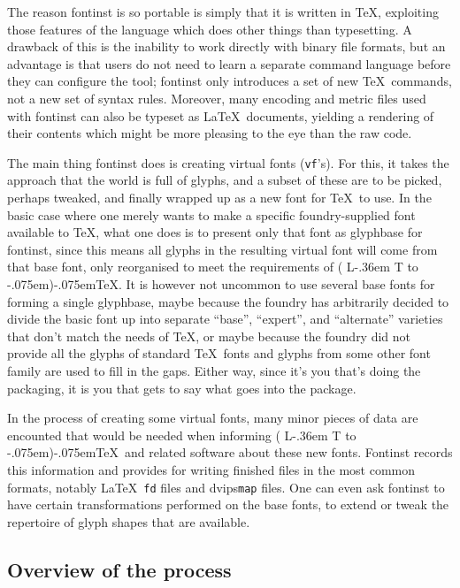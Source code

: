 \documentclass[a4paper]{ltxguide}
\makeatletter
\newcommand{\La}{%
   L\kern-.36em
   {%
      \setbox0\hbox{T}%
      \vbox to\ht0{\hbox{%
         $\m@th$\csname S@\f@size\endcsname
         \fontsize\sf@size\z@\math@fontsfalse\selectfont
         A%
      }\vss}%
   }%
}
\DeclareRobustCommand\AllTeX{(\La\kern-.075em)\kern-.075em\TeX}
\newcommand*{\setfilename}[1]{\texttt{#1}}
\newcommand*{\setpackagename}[1]{\textsf{#1}}
\newcommand{\dvips}   {\setpackagename{dvips}\xspace}
\newcommand{\fontinst}{\setpackagename{font\-inst}\xspace}
\newcommand{\Fontinst}{\setpackagename{Font\-inst}\xspace}
\newcommand{\vf} {\setfilename{vf}\xspace}
\newcommand{\fd} {\setfilename{fd}\xspace}
\newcommand{\map}{\setfilename{map}\xspace}
\makeatother
\begin{document}
The reason \fontinst is so portable is simply that it is written in 
\TeX, exploiting those features of the language which does other 
things than typesetting. A drawback of this is the inability to work 
directly with binary file formats, but an advantage is that users 
do not need to learn a separate command language before they can 
configure the tool; \fontinst only introduces a set of new \TeX\ 
commands, not a new set of syntax rules. Moreover, many encoding and 
metric files used with \fontinst can also be typeset as \LaTeX\ 
documents, yielding a rendering of their contents which might be more 
pleasing to the eye than the raw code.

The main thing \fontinst does is creating virtual fonts (\vf's). For 
this, it takes the approach that the world is full of glyphs, and a 
subset of these are to be picked, perhaps tweaked, and finally wrapped 
up as a new font for \TeX\ to use. In the basic case where one merely 
wants to make a specific foundry-supplied font available to \TeX, what 
one does is to present only that font as glyphbase for \fontinst, since 
this means all glyphs in the resulting virtual font will come from that 
base font, only reorganised to meet the requirements of \AllTeX. It is 
however not uncommon to use several base fonts for forming a single 
glyphbase, maybe because the foundry has arbitrarily decided to divide 
the basic font up into separate ``base'', ``expert'', and ``alternate'' 
varieties that don't match the needs of \TeX, or maybe because the 
foundry did not provide all the glyphs of standard \TeX\ fonts and glyphs 
from some other font family are used to fill in the gaps. Either way, 
since it's you that's doing the packaging, it is you that gets to say 
what goes into the package.

In the process of creating some virtual fonts, many minor pieces of 
data are encounted that would be needed when informing \AllTeX\ and 
related software about these new fonts. 
\Fontinst records this information and provides for writing finished 
files in the most common formats, notably \LaTeX\ \fd files and 
\dvips \map files. One can even ask \fontinst to have certain 
transformations performed on the base fonts, to extend or tweak the 
repertoire of glyph shapes that are available.


\subsection{Overview of the process}
\end{document}
